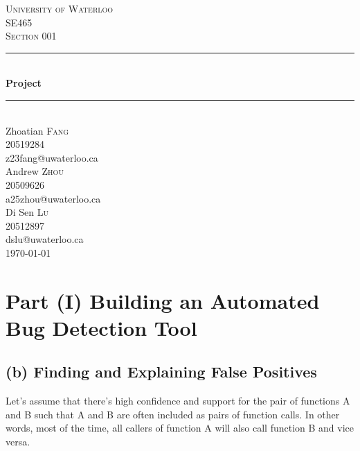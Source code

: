 \documentclass{article}
\begin{document}

\begin{titlepage}

\newcommand{\HRule}{\rule{\linewidth}{0.5mm}}

\center

\textsc{\huge University of Waterloo}\\[2cm]
\textsc{\LARGE SE465}\\[1cm] 
\textsc{\Large Section 001}\\[1cm] 

\HRule \\[0.5cm]
{ \Huge \bfseries Project}\\[0.5cm] 
\HRule \\[0.5cm]
 
\LARGE Zhoatian \textsc{Fang} \\  [0.5cm]
\Large 20519284 \\  [0.5cm]
z23fang@uwaterloo.ca \\ [1.5cm]

\LARGE Andrew \textsc{Zhou} \\  [0.5cm]
\Large 20509626 \\  [0.5cm]
a25zhou@uwaterloo.ca \\ [1.5cm]

\LARGE Di Sen \textsc{Lu} \\  [0.5cm]
\Large 20512897 \\  [0.5cm]
dslu@uwaterloo.ca \\ [1.5cm]

{\Large \today}\\

\vfill 

\end{titlepage}

\section*{Part (I) Building an Automated Bug Detection Tool}

\subsection*{(b) Finding and Explaining False Positives}
Let's assume that there's high confidence and support for the pair of functions A and B such that A and B are often included as pairs of function calls. In other words, most of the time, all callers of function A will also call function B and vice versa. \\
\end{document}
